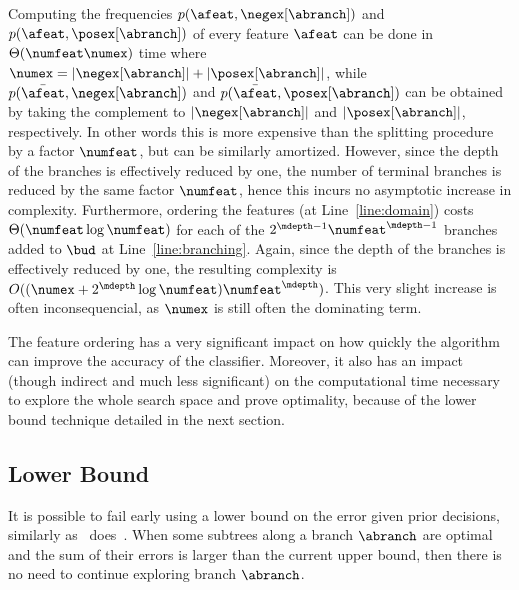 \documentclass{article}
\begin{document}


Computing the frequencies $p(\afeat,{\negex[\abranch]})$ and $p(\afeat,{\posex[\abranch]})$ of every feature $\afeat$ can be done in  $\Theta(\numfeat\numex)$ time where 
$\numex = |\negex[\abranch]|+|\posex[\abranch]|$, while $p(\bar{\afeat},{\negex[\abranch]})$ and $p(\bar{\afeat},{\posex[\abranch]})$ can be obtained by taking the complement to $|\negex[\abranch]|$ and $|\posex[\abranch]|$, respectively.
In other words this is more expensive than the splitting procedure by a factor $\numfeat$, but can be similarly amortized. However, since the depth of the branches is effectively reduced by one, the number of terminal branches is reduced by the same factor $\numfeat$, hence this incurs no asymptotic increase in complexity.
Furthermore, ordering the features (at Line~\ref{line:domain})
costs $\Theta(\numfeat \log \numfeat)$ for each of the $2^{\mdepth-1}\numfeat^{\mdepth-1}$ branches added to $\bud$ at Line~\ref{line:branching}. Again, since the depth of the branches is effectively reduced by one, the resulting complexity 
is $O((\numex + 2^{\mdepth} \log \numfeat) \numfeat^{\mdepth})$. This very slight increase is often inconsequencial, as 
$\numex$ is still often the dominating term.

The feature ordering has a very significant impact on how quickly the algorithm can improve the accuracy of the classifier. Moreover, it also has an impact (though indirect and much less significant) on the computational time necessary to explore the whole search space and prove optimality, because of the lower bound technique detailed in the next section.


\subsection{Lower Bound}
\label{sec:lb}

It is possible to fail early using a lower bound on the error given prior decisions, similarly as \dleight\ does~\cite{dl8}.
When some subtrees along a branch $\abranch$ are optimal and the sum of their errors is larger than the current upper bound, 
then there is no need to continue exploring branch $\abranch$. 
\end{document}
